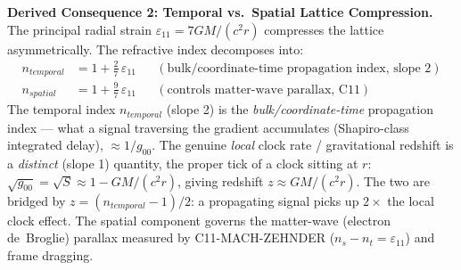 \noindent\textbf{Derived Consequence 2: Temporal vs.\ Spatial Lattice Compression.}
The principal radial strain $\varepsilon_{11} = 7GM/(c^2 r)$ compresses the lattice asymmetrically.
The refractive index decomposes into:
\begin{align}
    n_{temporal} &= 1 + \tfrac{2}{7}\,\varepsilon_{11} && (\text{bulk/coordinate-time propagation index, slope 2}) \nonumber \\
    n_{spatial} &= 1 + \tfrac{9}{7}\,\varepsilon_{11} && (\text{controls matter-wave parallax, C11})
    \label{eq:lattice_decomposition}
\end{align}
The temporal index $n_{temporal}$ (slope 2) is the \emph{bulk/coordinate-time}
propagation index --- what a signal traversing the gradient accumulates (Shapiro-class
integrated delay), $\approx 1/g_{00}$. The genuine \emph{local} clock rate / gravitational
redshift is a \emph{distinct} (slope 1) quantity, the proper tick of a clock sitting at $r$:
$\sqrt{g_{00}} = \sqrt{S} \approx 1 - GM/(c^2 r)$, giving redshift
$z \approx GM/(c^2 r)$. The two are bridged by $z = (n_{temporal} - 1)/2$: a propagating
signal picks up $2\times$ the local clock effect.
The spatial component governs the matter-wave (electron de~Broglie) parallax measured by
C11-MACH-ZEHNDER ($n_s - n_t = \varepsilon_{11}$) and frame dragging.
